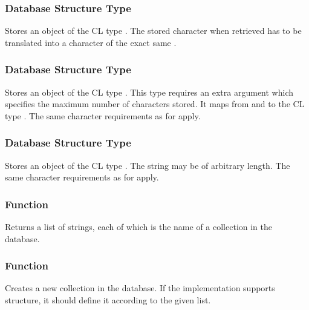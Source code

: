\subsubsection{Database Structure Type }
Stores an object of the CL type . The stored character when retrieved has to be translated into a character of the exact same .

\subsubsection{Database Structure Type }
Stores an object of the CL type . This type requires an extra argument which specifies the maximum number of characters stored. It maps from and to the CL type . The same character requirements as for  apply.

\subsubsection{Database Structure Type }
Stores an object of the CL type . The string may be of arbitrary length. The same character requirements as for  apply.

\subsubsection{Function }
Returns a list of strings, each of which is the name of a collection in the database.

\subsubsection{Function }
Creates a new collection in the database. If the implementation supports structure, it should define it according to the given  list.


